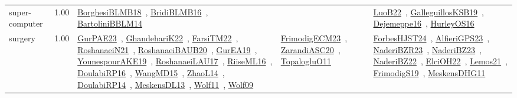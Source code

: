 {\begin{longtable}{p{3cm}r>{\raggedright\arraybackslash}p{6cm}>{\raggedright\arraybackslash}p{6cm}>{\raggedright\arraybackslash}p{8cm}}
\index{super-computer}\index{ApplicationAreas!super-computer}super-computer &  1.00 & \href{../works/BorghesiBLMB18.pdf}{BorghesiBLMB18}~\cite{BorghesiBLMB18}, \href{../works/BridiBLMB16.pdf}{BridiBLMB16}~\cite{BridiBLMB16}, \href{../works/BartoliniBBLM14.pdf}{BartoliniBBLM14}~\cite{BartoliniBBLM14} &  & \href{../works/LuoB22.pdf}{LuoB22}~\cite{LuoB22}, \href{../works/GalleguillosKSB19.pdf}{GalleguillosKSB19}~\cite{GalleguillosKSB19}, \href{../works/Dejemeppe16.pdf}{Dejemeppe16}~\cite{Dejemeppe16}, \href{../works/HurleyOS16.pdf}{HurleyOS16}~\cite{HurleyOS16}\\
\index{surgery}\index{ApplicationAreas!surgery}surgery &  1.00 & \href{../works/GurPAE23.pdf}{GurPAE23}~\cite{GurPAE23}, \href{../works/GhandehariK22.pdf}{GhandehariK22}~\cite{GhandehariK22}, \href{../works/FarsiTM22.pdf}{FarsiTM22}~\cite{FarsiTM22}, \href{../works/RoshanaeiN21.pdf}{RoshanaeiN21}~\cite{RoshanaeiN21}, \href{../works/RoshanaeiBAUB20.pdf}{RoshanaeiBAUB20}~\cite{RoshanaeiBAUB20}, \href{../works/GurEA19.pdf}{GurEA19}~\cite{GurEA19}, \href{../works/YounespourAKE19.pdf}{YounespourAKE19}~\cite{YounespourAKE19}, \href{../works/RoshanaeiLAU17.pdf}{RoshanaeiLAU17}~\cite{RoshanaeiLAU17}, \href{../works/RiiseML16.pdf}{RiiseML16}~\cite{RiiseML16}, \href{../works/DoulabiRP16.pdf}{DoulabiRP16}~\cite{DoulabiRP16}, \href{../works/WangMD15.pdf}{WangMD15}~\cite{WangMD15}, \href{../works/ZhaoL14.pdf}{ZhaoL14}~\cite{ZhaoL14}, \href{../works/DoulabiRP14.pdf}{DoulabiRP14}~\cite{DoulabiRP14}, \href{../works/MeskensDL13.pdf}{MeskensDL13}~\cite{MeskensDL13}, \href{../works/Wolf11.pdf}{Wolf11}~\cite{Wolf11}, \href{../works/Wolf09.pdf}{Wolf09}~\cite{Wolf09} & \href{../works/FrimodigECM23.pdf}{FrimodigECM23}~\cite{FrimodigECM23}, \href{../works/ZarandiASC20.pdf}{ZarandiASC20}~\cite{ZarandiASC20}, \href{../works/TopalogluO11.pdf}{TopalogluO11}~\cite{TopalogluO11} & \href{../works/ForbesHJST24.pdf}{ForbesHJST24}~\cite{ForbesHJST24}, \href{../works/AlfieriGPS23.pdf}{AlfieriGPS23}~\cite{AlfieriGPS23}, \href{../works/NaderiBZR23.pdf}{NaderiBZR23}~\cite{NaderiBZR23}, \href{../works/NaderiBZ23.pdf}{NaderiBZ23}~\cite{NaderiBZ23}, \href{../works/NaderiBZ22.pdf}{NaderiBZ22}~\cite{NaderiBZ22}, \href{../works/ElciOH22.pdf}{ElciOH22}~\cite{ElciOH22}, \href{../works/Lemos21.pdf}{Lemos21}~\cite{Lemos21}, \href{../works/FrimodigS19.pdf}{FrimodigS19}~\cite{FrimodigS19}, \href{../works/MeskensDHG11.pdf}{MeskensDHG11}~\cite{MeskensDHG11}\\

\end{longtable}}
